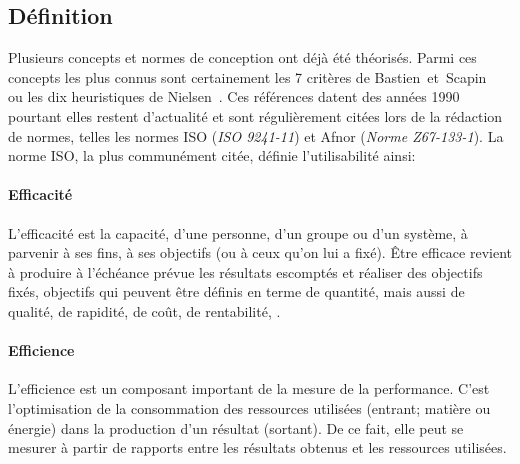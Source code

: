     \subsection{Définition}
        Plusieurs concepts et normes de conception ont déjà été théorisés. Parmi ces concepts les plus connus sont certainement les 7 critères de Bastien~et~Scapin~ ou les dix heuristiques de Nielsen~. Ces références datent des années 1990 pourtant elles restent d'actualité et sont régulièrement citées lors de la rédaction de normes, telles les normes ISO (\textit{ISO 9241-11}) et Afnor (\textit{Norme Z67-133-1}).
        La norme ISO, la plus communément citée, définie l'utilisabilité ainsi:
        \paragraph{Efficacité} 
            L'efficacité est la capacité, d'une personne, d'un groupe ou d'un système, à parvenir à ses fins, à ses objectifs (ou à ceux qu'on lui a fixé). Être efficace revient à produire à l'échéance prévue les résultats escomptés et réaliser des objectifs fixés, objectifs qui peuvent être définis en terme de quantité, mais aussi de qualité, de rapidité, de coût, de rentabilité, \etc. 
        \paragraph{Efficience}
            L'efficience est un composant important de la mesure de la performance. C'est l'optimisation de la consommation des ressources utilisées (entrant; matière ou énergie) dans la production d'un résultat (sortant). De ce fait, elle peut se mesurer à partir de rapports entre les résultats obtenus et les ressources utilisées.
